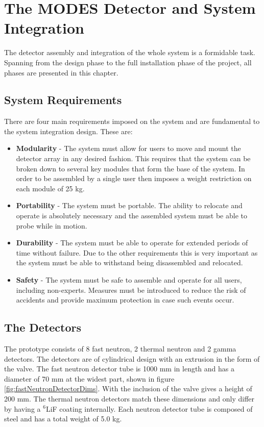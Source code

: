 \chapter{The MODES Detector and System Integration}

The detector assembly and integration of the whole system is a formidable task. Spanning from the design phase to the full installation phase of the project, all phases are presented in this chapter.  

\section{System Requirements}
There are four main requirements imposed on the system and are fundamental to the system integration design. These are:
\begin{itemize}

	\item \textbf{Modularity} - The system must allow for users to move and mount the detector array in any desired fashion. This requires that the system can be broken down to several key modules that form the base of the system. In order to be assembled by a single user then imposes a weight restriction on each module of 25 kg.
	\item \textbf{Portability} - The system must be portable. The ability to relocate and operate is absolutely necessary and the assembled system must be able to probe while in motion.
	\item \textbf{Durability} - The system must be able to operate for extended periods of time without failure. Due to the other requirements this is very important as the system must be able to withstand being disassembled and relocated.
	\item \textbf{Safety} - The system must be safe to assemble and operate for all users, including non-experts. Measures must be introduced to reduce the risk of accidents and provide maximum protection in case such events occur.
\end{itemize}

\section{The Detectors}
The prototype consists of 8 fast neutron, 2 thermal neutron and 2 gamma detectors. The detectors are of cylindrical design with an extrusion in the form of the valve. The fast neutron detector tube is 1000 mm in length and has a diameter of 70 mm at the widest part, shown in figure \ref{fig:fastNeutronDetectorDims}. With the inclusion of the valve gives a height of 200 mm. The thermal neutron detectors match these dimensions and only differ by having a $^{6}$LiF coating internally. Each neutron detector tube is composed of steel and has a total weight of 5.0 kg. 

